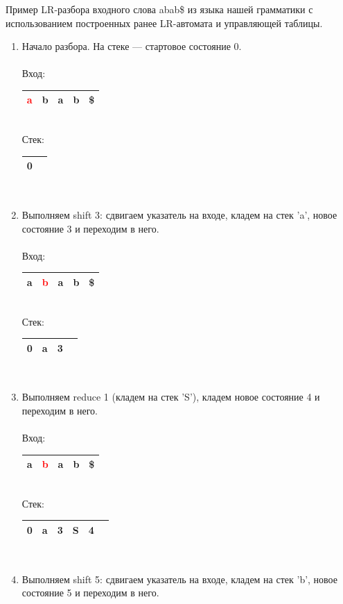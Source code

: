 \begin{example}
Пример LR-разбора входного слова abab\$ из языка нашей грамматики с использованием построенных ранее LR-автомата и управляющей таблицы.
\begin{enumerate}
\item Начало разбора. На стеке --- стартовое состояние 0. \\ \\
Вход: \,
\begin{tabular}[c]{ |c|c|c|c|c| } 
    \hline \textcolor{red}{a} & b & a & b & \$ \\ \hline
\end{tabular} \\
Стек: \,
\begin{tabular}[c]{ |c|c } 
    \hline 0 & \\ \hline
\end{tabular}  
\\
\item Выполняем shift 3: сдвигаем указатель на входе, кладем на стек 'a', новое состояние 3 и переходим в него. \\ \\
Вход: \,
\begin{tabular}[c]{ |c|c|c|c|c| } 
    \hline a & \textcolor{red}{b} & a & b & \$ \\ \hline
\end{tabular} \\
Стек: \,
\begin{tabular}[c]{ |c|c|c|c } 
    \hline 0 & a & 3 & \\ \hline
\end{tabular}
\\ 
\item Выполняем reduce 1 (кладем на стек 'S'), кладем новое состояние 4 и переходим в него. \\ \\
Вход: \,
\begin{tabular}[c]{ |c|c|c|c|c| } 
    \hline a & \textcolor{red}{b} & a & b & \$ \\ \hline
\end{tabular} \\
Стек: \,
\begin{tabular}[c]{ |c|c|c|c|c|c } 
    \hline 0 & a & 3 & S & 4 & \\ \hline
\end{tabular}
\\ 
\item Выполняем shift 5: сдвигаем указатель на входе, кладем на стек 'b', новое состояние 5 и переходим в него. \\ \\

\end{enumerate}
\end{example}
